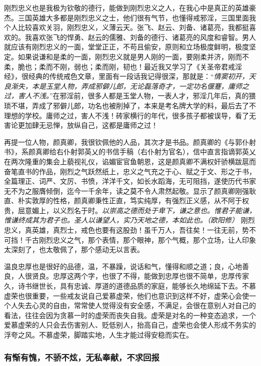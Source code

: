 刚烈忠义也是我极为钦敬的德行，能做到刚烈忠义之人，在我心中是真正的英雄豪杰。三国英雄大多都是刚烈忠义之士，他们很有气节，也懂得戒邪淫，三国里面我个人比较喜欢关羽，刚烈忠义，义薄云天。张飞、赵云、刘备、诸葛亮，我都挺喜欢的。我喜欢张飞的悍勇、赵云的儒雅、刘备的德行、诸葛亮的风度和睿智。男人就应该有刚烈忠义的一面，堂堂正正，不苟且偷安，原则和立场极度鲜明，极度坚定。如果说谦和是柔的一面，刚烈忠义就是男人刚的一面，要刚柔并济，刚而不柔，脆也；柔而不刚，弱也；柔而刚，韧也！最近我又学习了《关圣帝君戒淫经》，很经典的传统戒色文章，里面有一段话我记得很深，那就是：“\textit{情窦初开，天良渐失，本是玉堂人物，弄成邪僻儿郎，无论磊落奇才，一定功名偃蹇，庸师之过，害人不浅。}”在邪淫前，很多人都是玉堂人物，一表人才，邪淫几年后，真的猥琐不堪，弄成了邪僻儿郎，功名也被削掉了，本来是考名牌大学的料，最后去了不理想的学校。庸师之过，害人不浅！砖家横行的年代，很多孩子都被误导，看了无害论更加肆无忌惮，放纵自己，这都是庸师之过！

再提一位人物，颜真卿，我很钦佩他的人品，其次才是书品。颜真卿的《与郭仆射书》，系颜真卿给右仆射郭英乂的书信手稿（右仆射为官名），信中直言指谪郭英乂在两次隆重的集会上藐视礼仪，谄媚宦官鱼朝恩，这是颜真卿不满权奸骄横跋扈而奋笔直书的作品，刚烈之气跃然纸上，忠义之气充之于心、赋之于文、形之于书，全篇理正、词严、文厉、书愤，洋洋千文，如长水蹈海，无可阻挡，遂使历代书家无不为之服膺倾倒，迄今一千余年，读之莫不令人肃然起敬。显示了颜真卿刚强耿直、朴实敦厚的性格，颜真卿秉性正直，笃实纯厚，有强烈正义感，从不阿于权贵，屈意媚上，以义烈名于时。\textit{以崇高之德而处于卑下，谦之意也。惟君子能谦，惟谦终成其为君子也。圣人以谦望人，实乃天地之德，本如此也。（欧阳修）} 刚烈忠义，真英雄，真烈士，戒色也要有这股劲！虽千万人，吾往矣！一往无前，势不可挡！千古刚烈忠义之气，那个表情，那个眼神，那个气概，那个立场，让人印象太深刻了，也太敬佩了，那个感动无以言表。

温良忠厚也是很好的品德，温，不暴躁，说话和气，懂得和顺之道；良，心地善良，人很贤良。忠厚这两个字，也很了不得，能做到忠厚也很不简单，忠厚传家久，诗书继世长，具有忠诚、厚道的道德品质的家庭，能够长久地绵延下去。不慕虚荣也很重要，一些戒友说自己爱慕虚荣，他们也意识到这样不好，虚荣心会使一个人失去心灵的自由，常常使人觉得没有安全感，不满足，会很在意别人对自己的看法，往往会因为贪慕一时的虚荣而丧失自我。虚荣是对名的一种变态追求，一个爱慕虚荣的人只会去伤害别人、贬低别人，抬高自己，虚荣也会使人形成不务实的浮夸之风。不慕虚荣，脚踏实地，人生才能过得安稳而实在。

\subsubsection{有惭有愧，不骄不炫，无私奉献，不求回报}

